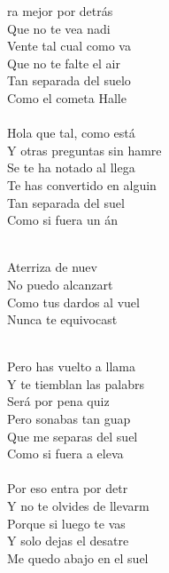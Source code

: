 \begin{cancion}%
	ra mejor por detrás\\
	Que no te vea nadi\\
	Vente tal cual como va\\
	Que no te falte el air\\
	Tan separada del suelo\\
	Como el cometa Halle\\
\jump\\
	Hola que tal, como está\\
	Y otras preguntas sin hamre\\
	Se te ha notado al llega\\
	Te has convertido en alguin\\
	Tan separada del suel\\
	Como si fuera un án\\\jump\\
	\begin{chorus}%
	Aterriza de nuev  \\
	No puedo alcanzart\\
	Como tus dardos al vuel  \\
	Nunca te equivocast\\
	\end{chorus}%
	\jump\\
	Pero has vuelto a llama\\
	Y te tiemblan las palabrs\\
	Será por pena quiz\\
	Pero sonabas tan guap\\
	Que me separas del suel\\
	Como si fuera a eleva\\
\jump\\
	Por eso entra por detr\\
	Y no te olvides de llevarm\\
	Porque si luego te vas\\
	Y solo dejas el desatre\\
	Me quedo abajo en el suel\\

\end{cancion}
